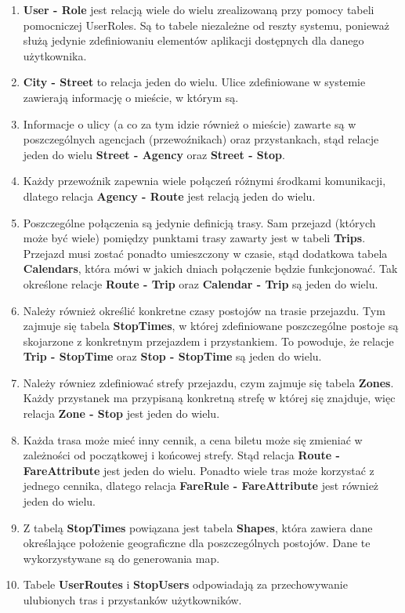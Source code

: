 \documentclass[10pt,a4paper]{article}
\begin{document}
\begin{enumerate}
	\item \textbf{User - Role} jest relacją wiele do wielu zrealizowaną przy pomocy tabeli pomocniczej UserRoles. Są to tabele niezależne od reszty systemu, ponieważ służą jedynie zdefiniowaniu elementów aplikacji dostępnych dla danego użytkownika.
	\item \textbf{City - Street} to relacja jeden do wielu. Ulice zdefiniowane w systemie zawierają informację o mieście, w którym są.
	\item Informacje o ulicy (a co za tym idzie również o mieście) zawarte są w poszczególnych agencjach (przewoźnikach) oraz przystankach, stąd relacje jeden do wielu \textbf{Street - Agency} oraz \textbf{Street - Stop}.
	\item Każdy przewoźnik zapewnia wiele połączeń różnymi środkami komunikacji, dlatego relacja \textbf{Agency - Route} jest relacją jeden do wielu.
	\item Poszczególne połączenia są jedynie definicją trasy. Sam przejazd (których może być wiele) pomiędzy punktami trasy zawarty jest w tabeli \textbf{Trips}. Przejazd musi zostać ponadto umieszczony w czasie, stąd dodatkowa tabela \textbf{Calendars}, która mówi w jakich dniach połączenie będzie funkcjonować. Tak określone relacje \textbf{Route - Trip} oraz \textbf{Calendar - Trip} są jeden do wielu.
	\item Należy również określić konkretne czasy postojów na trasie przejazdu. Tym zajmuje się tabela \textbf{StopTimes}, w której zdefiniowane poszczególne postoje są skojarzone z konkretnym przejazdem i przystankiem. To powoduje, że relacje \textbf{Trip - StopTime} oraz \textbf{Stop - StopTime} są jeden do wielu.
	\item Należy równiez zdefiniować strefy przejazdu, czym zajmuje się tabela \textbf{Zones}. Każdy przystanek ma przypisaną konkretną strefę w której się znajduje, więc relacja \textbf{Zone - Stop} jest jeden do wielu.
	\item Każda trasa może mieć inny cennik, a cena biletu może się zmieniać w zależności od początkowej i końcowej strefy. Stąd relacja \textbf{Route - FareAttribute} jest jeden do wielu. Ponadto wiele tras może korzystać z jednego cennika, dlatego relacja \textbf{FareRule - FareAttribute} jest również jeden do wielu.
	\item Z tabelą \textbf{StopTimes} powiązana jest tabela \textbf{Shapes}, która zawiera dane określające położenie geograficzne dla poszczególnych postojów. Dane te wykorzystywane są do generowania map.
	\item Tabele \textbf{UserRoutes} i \textbf{StopUsers} odpowiadają za przechowywanie ulubionych tras i przystanków użytkowników.
\end{enumerate}
\end{document}
